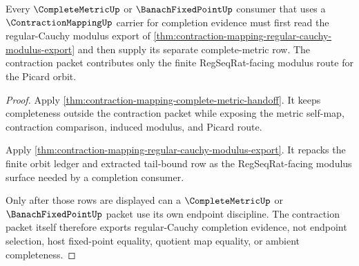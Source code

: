 \begin{theorem}
\label{thm:contraction-mapping-complete-metric-regular-cauchy-handoff}
Every $\CompleteMetricUp$ or $\BanachFixedPointUp$ consumer that uses a $\ContractionMappingUp$ carrier for completion evidence must first read the regular-Cauchy modulus export of \autoref{thm:contraction-mapping-regular-cauchy-modulus-export} and then supply its separate complete-metric row. The contraction packet contributes only the finite RegSeqRat-facing modulus route for the Picard orbit.
\end{theorem}
\begin{proof}
Apply \autoref{thm:contraction-mapping-complete-metric-handoff}. It keeps completeness outside the contraction packet while exposing the metric self-map, contraction comparison, induced modulus, and Picard route.

Apply \autoref{thm:contraction-mapping-regular-cauchy-modulus-export}. It repacks the finite orbit ledger and extracted tail-bound row as the RegSeqRat-facing modulus surface needed by a completion consumer.

Only after those rows are displayed can a $\CompleteMetricUp$ or $\BanachFixedPointUp$ packet use its own endpoint discipline. The contraction packet itself therefore exports regular-Cauchy completion evidence, not endpoint selection, host fixed-point equality, quotient map equality, or ambient completeness.
\end{proof}

